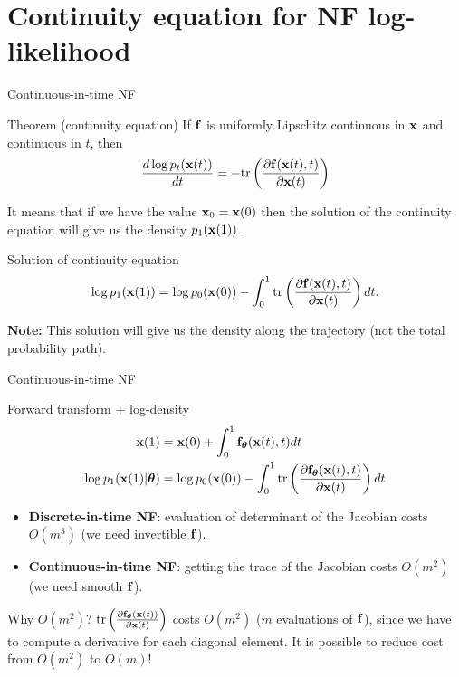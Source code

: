 \section{Continuity equation for NF log-likelihood}
\begin{frame}{Continuous-in-time NF}
	\begin{block}{Theorem (continuity equation)}
		If $\mathbf{f}$ is uniformly Lipschitz continuous in $\mathbf{x}$ and continuous in $t$, then
		\[
			\frac{d \log p_t(\mathbf{x}(t))}{d t} = - \text{tr} \left( \frac{\partial \mathbf{f}(\mathbf{x}(t), t)}{\partial \mathbf{x}(t)} \right)
		\]
		\vspace{-0.3cm}
	\end{block}
	It means that if we have the value $\mathbf{x}_0 = \mathbf{x}(0)$ then the solution of the continuity equation will give us the density $p_1(\mathbf{x}(1))$.
	\begin{block}{Solution of continuity equation}
		\vspace{-0.3cm}
		\[
			\log p_1(\mathbf{x}(1)) = \log p_0(\mathbf{x}(0)) - \int_{0}^{1} \text{tr}  \left( \frac{\partial \mathbf{f}(\mathbf{x}(t), t)}{\partial \mathbf{x}(t)} \right) dt.
		\]
	\end{block}
	\textbf{Note:} This solution will give us the density along the trajectory (not the total probability path).
\end{frame}
\begin{frame}{Continuous-in-time NF}
	\begin{block}{Forward transform + log-density}
		\vspace{-0.7cm}
		\begin{align*}
				\mathbf{x}(1) &= \mathbf{x}(0) + \int_{0}^{1} \mathbf{f}_{\boldsymbol{\theta}}(\mathbf{x}(t), t) dt \\
				\log p_1(\mathbf{x}(1) | \boldsymbol{\theta}) &= \log p_0(\mathbf{x}(0)) - \int_{0}^{1} \text{tr} \left( \frac{\partial \mathbf{f}_{\boldsymbol{\theta}}(\mathbf{x}(t), t)}{\partial \mathbf{x}(t)} \right) dt
		\end{align*}		
		\vspace{-0.3cm}
	\end{block}
	\begin{itemize}
		\item \textbf{Discrete-in-time NF}: evaluation of determinant of the Jacobian costs $O(m^3)$ (we need invertible $\mathbf{f}$).
		\item \textbf{Continuous-in-time NF}: getting the trace of the Jacobian costs $O(m^2)$ (we need smooth $\mathbf{f}$).
	\end{itemize}
	\begin{block}{Why $O(m^2)$?}
		$\text{tr} \left( \frac{\partial \mathbf{f}_{\boldsymbol{\theta}}(\mathbf{x}(t))}{\partial \mathbf{x}(t)} \right)$ costs $O(m^2)$ ($m$ evaluations of $\mathbf{f}$), since we have to compute a derivative for each diagonal element. It is possible to reduce cost from $O(m^2)$ to $O(m)$!
	\end{block}
\end{frame}
